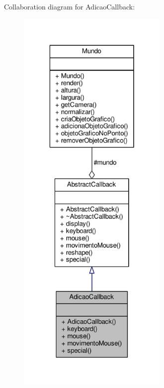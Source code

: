 Collaboration diagram for Adicao\+Callback\+:
\nopagebreak
\begin{figure}[H]
\begin{center}
\leavevmode
\includegraphics[height=550pt]{classAdicaoCallback__coll__graph}
\end{center}
\end{figure}
